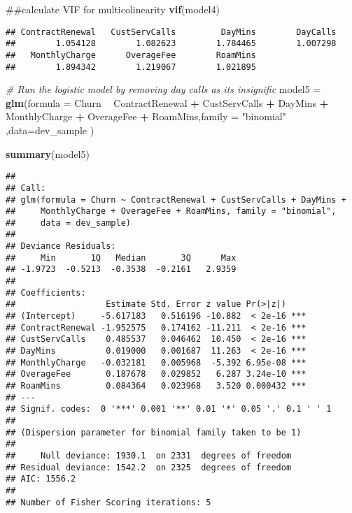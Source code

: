 \documentclass[]{article}
\newenvironment{Shaded}{\begin{snugshade}}{\end{snugshade}}
\newcommand{\KeywordTok}[1]{\textcolor[rgb]{0.13,0.29,0.53}{\textbf{#1}}}
\newcommand{\DataTypeTok}[1]{\textcolor[rgb]{0.13,0.29,0.53}{#1}}
\newcommand{\StringTok}[1]{\textcolor[rgb]{0.31,0.60,0.02}{#1}}
\newcommand{\CommentTok}[1]{\textcolor[rgb]{0.56,0.35,0.01}{\textit{#1}}}
\newcommand{\OperatorTok}[1]{\textcolor[rgb]{0.81,0.36,0.00}{\textbf{#1}}}
\newcommand{\NormalTok}[1]{#1}
\begin{document}
\begin{Shaded}
\begin{Highlighting}[]
\NormalTok{  ##calculate VIF for multicolinearity }
    \KeywordTok{vif}\NormalTok{(model4)    }
\end{Highlighting}
\end{Shaded}

\begin{verbatim}
## ContractRenewal   CustServCalls         DayMins        DayCalls 
##        1.054128        1.082623        1.784465        1.007298 
##   MonthlyCharge      OverageFee        RoamMins 
##        1.894342        1.219067        1.021895
\end{verbatim}

\begin{Shaded}
\begin{Highlighting}[]
    \CommentTok{# Run the logistic model by removing day calls  as its insignific}
\NormalTok{  model5 =}\StringTok{ }\KeywordTok{glm}\NormalTok{(}\DataTypeTok{formula =}\NormalTok{ Churn }\OperatorTok{~}\StringTok{    }\NormalTok{ContractRenewal  }\OperatorTok{+}\StringTok{ }\NormalTok{CustServCalls }\OperatorTok{+}\StringTok{ }\NormalTok{DayMins }\OperatorTok{+}\StringTok{ }\NormalTok{MonthlyCharge }\OperatorTok{+}\StringTok{ }\NormalTok{OverageFee }\OperatorTok{+}\StringTok{ }\NormalTok{RoamMins,}\DataTypeTok{family =} \StringTok{"binomial"}\NormalTok{ ,}\DataTypeTok{data=}\NormalTok{dev_sample )}

  \KeywordTok{summary}\NormalTok{(model5)  }
\end{Highlighting}
\end{Shaded}

\begin{verbatim}
## 
## Call:
## glm(formula = Churn ~ ContractRenewal + CustServCalls + DayMins + 
##     MonthlyCharge + OverageFee + RoamMins, family = "binomial", 
##     data = dev_sample)
## 
## Deviance Residuals: 
##     Min       1Q   Median       3Q      Max  
## -1.9723  -0.5213  -0.3538  -0.2161   2.9359  
## 
## Coefficients:
##                  Estimate Std. Error z value Pr(>|z|)    
## (Intercept)     -5.617183   0.516196 -10.882  < 2e-16 ***
## ContractRenewal -1.952575   0.174162 -11.211  < 2e-16 ***
## CustServCalls    0.485537   0.046462  10.450  < 2e-16 ***
## DayMins          0.019000   0.001687  11.263  < 2e-16 ***
## MonthlyCharge   -0.032181   0.005968  -5.392 6.95e-08 ***
## OverageFee       0.187678   0.029852   6.287 3.24e-10 ***
## RoamMins         0.084364   0.023968   3.520 0.000432 ***
## ---
## Signif. codes:  0 '***' 0.001 '**' 0.01 '*' 0.05 '.' 0.1 ' ' 1
## 
## (Dispersion parameter for binomial family taken to be 1)
## 
##     Null deviance: 1930.1  on 2331  degrees of freedom
## Residual deviance: 1542.2  on 2325  degrees of freedom
## AIC: 1556.2
## 
## Number of Fisher Scoring iterations: 5
\end{verbatim}
\end{document}
